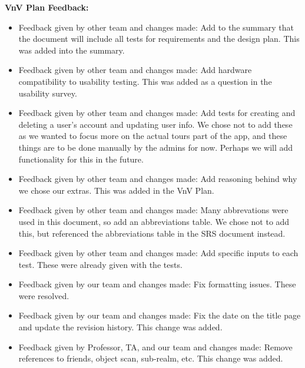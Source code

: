 \documentclass{article}
\begin{document}
\textbf{VnV Plan Feedback:}
\begin{itemize}
    \item Feedback given by other team and changes made: Add to the summary that the document will include all tests for requirements and the design plan. This was added into the summary.
    \item Feedback given by other team and changes made: Add hardware compatibility to usability testing. This was added as a question in the usability survey.
    \item Feedback given by other team and changes made: Add tests for creating and deleting a user's account and updating user info. We chose not to add these as we wanted to focus more on the actual tours part of the app, and these things are to be done manually by the admins for now. Perhaps we will add functionality for this in the future.
    \item Feedback given by other team and changes made: Add reasoning behind why we chose our extras. This was added in the VnV Plan.
    \item Feedback given by other team and changes made: Many abbrevations were used in this document, so add an abbreviations table. We chose not to add this, but referenced the abbreviations table in the SRS document instead.
    \item Feedback given by other team and changes made: Add specific inputs to each test. These were already given with the tests.
    \item Feedback given by our team and changes made: Fix formatting issues. These were resolved.
    \item Feedback given by our team and changes made: Fix the date on the title page and update the revision history. This change was added.
    \item Feedback given by Professor, TA, and our team and changes made: Remove references to friends, object scan, sub-realm, etc. This change was added.
\end{itemize}
\end{document}

